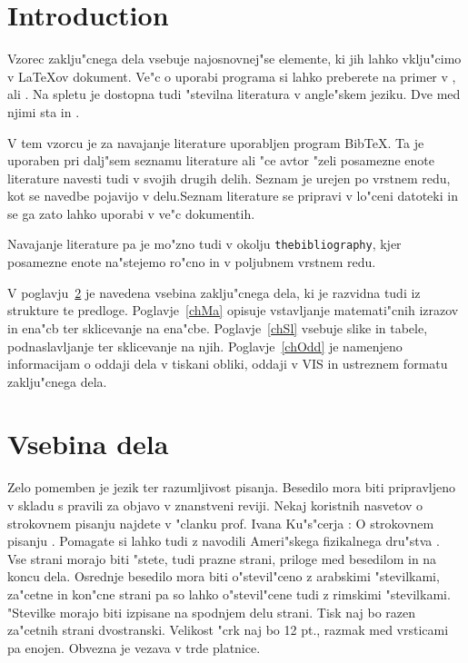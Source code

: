 \pagestyle{fancy}
\fancyhead[CE,RE]{}
\fancyhead[LO,CO]{}
\fancyhead[LE]{\textbf{\nouppercase{\leftmark}}}
\fancyhead[RO]{\textbf{\nouppercase{\rightmark}}}

%
\chapter{Introduction}
\label{chInt}
Vzorec zaklju"cnega dela vsebuje najosnovnej"se elemente, ki jih lahko vklju"cimo v \LaTeX{}ov dokument. 
Ve"c o uporabi programa si lahko preberete na primer v \cite{Go}, \cite{Ba} ali \cite{Ra}. 
Na spletu je dostopna tudi "stevilna literatura v angle"skem jeziku. Dve med njimi sta \cite{ams}  in \cite{Gr}.

V tem vzorcu je za navajanje literature uporabljen program Bib\TeX. Ta je uporaben pri dalj"sem seznamu literature ali "ce avtor "zeli posamezne enote literature navesti tudi v svojih drugih delih. 
Seznam je urejen po vrstnem redu, kot se navedbe pojavijo v delu.Seznam literature se pripravi v lo"ceni datoteki in se ga zato lahko uporabi v ve"c dokumentih.



Navajanje literature pa je mo"zno tudi v okolju {\tt thebibliography}, kjer posamezne enote na"stejemo ro"cno in v poljubnem vrstnem redu.

V poglavju~\ref{chVse} je navedena vsebina zaklju"cnega dela, ki je razvidna tudi iz strukture te predloge.
Poglavje~\ref{chMa} opisuje vstavljanje matemati"cnih izrazov in ena"cb ter sklicevanje na ena"cbe. 
Poglavje~\ref{chSl} vsebuje slike in tabele, podnaslavljanje ter sklicevanje na njih.
Poglavje~\ref{chOdd} je namenjeno informacijam o oddaji dela v tiskani obliki, oddaji v \ac{VIS} in ustreznem formatu zaklju"cnega dela.


%
\chapter{Vsebina dela}
\label{chVse}

Zelo pomemben je jezik ter razumljivost pisanja. Besedilo mora biti pripravljeno v skladu s pravili za objavo v znanstveni reviji. 
Nekaj koristnih nasvetov o strokovnem pisanju najdete v "clanku prof. Ivana Ku"s"cerja : O strokovnem pisanju \cite{Ku}. 
Pomagate si lahko tudi z navodili Ameri"skega fizikalnega dru"stva \cite{APS}.\\

Vse strani morajo biti "stete, tudi prazne strani, priloge med besedilom in na koncu dela. 
Osrednje besedilo mora biti o"stevil"ceno z arabskimi "stevilkami, za"cetne in kon"cne strani pa so lahko o"stevil"cene tudi z rimskimi "stevilkami. 
"Stevilke morajo biti izpisane na spodnjem delu strani. Tisk naj bo razen za"cetnih strani dvostranski. Velikost "crk naj bo 12 pt., razmak med vrsticami pa enojen. 
Obvezna je vezava v trde platnice.\\

